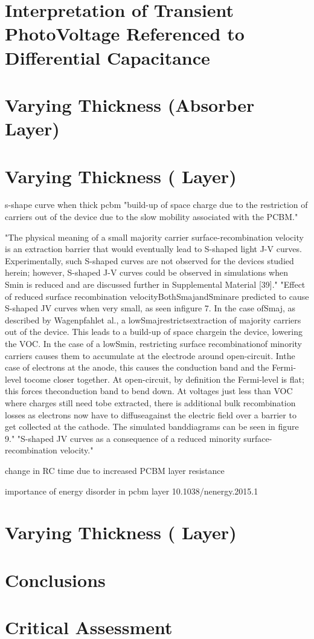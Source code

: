 \section{Interpretation of Transient PhotoVoltage Referenced to Differential Capacitance}\label{interpretation_tpvdc}

\section{Varying  Thickness (Absorber Layer)}


\section{Varying  Thickness ( Layer)}

s-shape curve when thick pcbm \cite{Wheeler2017} "build-up of space charge due to the restriction of carriers out of the device due to the slow mobility associated with the PCBM."


"The physical meaning of a small majority carrier surface-recombination velocity is an extraction barrier that would eventually lead to S-shaped light J-V curves. Experimentally, such S-shaped curves are not observed for the devices studied herein; however, S-shaped J-V curves could be observed in simulations when Smin is reduced and are discussed further in Supplemental Material [39]."
"Effect of reduced surface recombination velocityBothSmajandSminare predicted to cause S-shaped JV curves when very small, as seen infigure 7.  In the case ofSmaj,  as described by Wagenpfahlet al.,  a lowSmajrestrictsextraction of majority carriers out of the device.  This leads to a build-up of space chargein the device, lowering the VOC.  In the case of a lowSmin, restricting surface recombinationof  minority  carriers  causes  them  to  accumulate  at  the  electrode  around  open-circuit.   Inthe case of electrons at the anode, this causes the conduction band and the Fermi-level tocome closer together.  At open-circuit, by definition the Fermi-level is flat;  this forces theconduction band to bend down.  At voltages just less than VOC where charges still need tobe extracted, there is additional bulk recombination losses as electrons now have to diffuseagainst the electric field over a barrier to get collected at the cathode.  The simulated banddiagrams can be seen in figure 9."
"S-shaped JV curves as a consequence of a reduced minority surface-recombination velocity." \cite{Wheeler2015}

change in RC time due to increased PCBM layer resistance \cite{Wheeler2017}

importance of energy disorder in pcbm layer 10.1038/nenergy.2015.1

\section{Varying  Thickness ( Layer)}
\section{Conclusions}
\section{Critical Assessment}